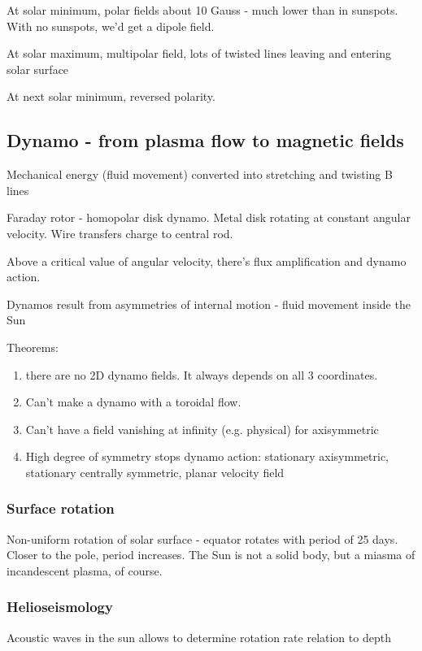 \documentclass[PlasmaNotes.tex]{subfiles}
\begin{document}
At solar minimum, polar fields about 10 Gauss - much lower than in sunspots. With no sunspots, we'd get a dipole field. 

At solar maximum, multipolar field, lots of twisted lines leaving and entering solar surface

At next solar minimum, reversed polarity.

\subsection{Dynamo - from plasma flow to magnetic fields}

Mechanical energy (fluid movement) converted into stretching and twisting B lines

Faraday rotor - homopolar disk dynamo. Metal disk rotating at constant angular velocity. Wire transfers charge to central rod.

Above a critical value of angular velocity, there's flux amplification and dynamo action.

Dynamos result from asymmetries of internal motion - fluid movement inside the Sun

Theorems:
\begin{enumerate}
\item there are no 2D dynamo fields. It always depends on all 3 coordinates.
\item Can't make a dynamo with a toroidal flow.
\item Can't have a field vanishing at infinity (e.g. physical) for axisymmetric
\item High degree of symmetry stops dynamo action: stationary axisymmetric, stationary centrally symmetric, planar velocity field
\end{enumerate}

\subsubsection{Surface rotation}
Non-uniform rotation of solar surface - equator rotates with period of 25 days. Closer to the pole, period increases. The Sun is not a solid body, but a miasma of incandescent plasma, of course.

\subsubsection{Helioseismology}

Acoustic waves in the sun allows to determine rotation rate relation to depth
\end{document}
